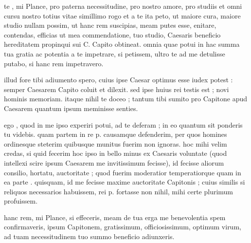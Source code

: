  te , mi Plance, pro paterna necessitudine, pro nostro amore, pro studiis et omni cursu nostro totius vitae simillimo rogo et a te ita peto, ut maiore cura, maiore studio nullam possim, ut hanc rem suscipias, meam putes esse, enitare, contendas, efficias ut mea commendatione, tuo studio, Caesaris beneficio hereditatem propinqui sui C. Capito obtineat. omnia quae potui in hac summa tua gratia ac potentia a te impetrare, si petissem, ultro te ad me detulisse putabo, si hanc rem impetravero.

 illud fore tibi adiumento spero, cuius ipse Caesar optimus esse iudex potest : semper Caesarem Capito coluit et dilexit. sed ipse huius rei testis est ; novi hominis memoriam. itaque nihil te doceo ; tantum tibi sumito pro Capitone apud Caesarem quantum ipsum meminisse senties.

 ego , quod in me ipso experiri potui, ad te deferam ; in eo quantum sit ponderis tu videbis. quam partem in re p. causamque defenderim, per quos homines ordinesque steterim quibusque munitus fuerim non ignoras. hoc mihi velim credas, si quid fecerim hoc ipso in bello minus ex Caesaris voluntate (quod intellexi scire ipsum Caesarem me invitissimum fecisse), id fecisse aliorum consilio, hortatu, auctoritate ; quod fuerim moderatior temperatiorque quam in ea parte . quisquam, id me fecisse maxime auctoritate Capitonis ; cuius similis si reliquos necessarios habuissem, rei p. fortasse non nihil, mihi certe plurimum profuissem.

 hanc rem, mi Plance, si effeceris, meam de tua erga me benevolentia spem confirmaveris, ipsum Capitonem, gratissimum, officiosissimum, optimum virum, ad tuam necessitudinem tuo summo beneficio adiunxeris.
